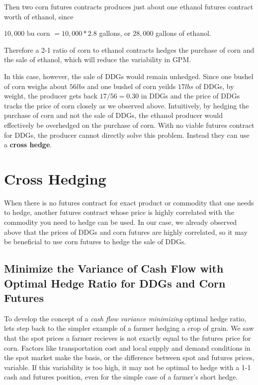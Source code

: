 \documentclass[
  letterpaper,
  DIV=11,
  numbers=noendperiod]{scrreprt}
\begin{document}
Then two corn futures contracts produces just about one ethanol futures
contract worth of ethanol, since

\(10,000\) bu corn \(= 10,000*2.8\) gallons, or \(28,000\) gallons of
ethanol.

Therefore a 2-1 ratio of corn to ethanol contracts hedges the purchase
of corn and the sale of ethanol, which will reduce the variability in
GPM.

In this case, however, the sale of DDGs would remain unhedged. Since one
bushel of corn weighs about \(56lbs\) and one bushel of corn yeilds
\(17lbs\) of DDGs, by weight, the producer gets back \(17/56 = 0.30\) in
DDGs and the price of DDGs tracks the price of corn closely as we
observed above. Intuitively, by hedging the purchase of corn and not the
sale of DDGs, the ethanol producer would effectively be overhedged on
the purchase of corn. With no viable futures contract for DDGs, the
producer cannot directly solve this problem. Instead they can use a
\textbf{cross hedge}.

\hypertarget{cross-hedging}{%
\section{Cross Hedging}\label{cross-hedging}}

When there is no futures contract for exact product or commodity that
one needs to hedge, another futures contract whose price is highly
correlated with the commodity you need to hedge can be used. In our
case, we already observed above that the prices of DDGs and corn futures
are highly correlated, so it may be beneficial to use corn futures to
hedge the sale of DDGs.

\hypertarget{minimize-the-variance-of-cash-flow-with-optimal-hedge-ratio-for-ddgs-and-corn-futures}{%
\subsection{Minimize the Variance of Cash Flow with Optimal Hedge Ratio
for DDGs and Corn
Futures}\label{minimize-the-variance-of-cash-flow-with-optimal-hedge-ratio-for-ddgs-and-corn-futures}}

To develop the concept of a \emph{cash flow variance minimizing} optimal
hedge ratio, lets step back to the simpler example of a farmer hedging a
crop of grain. We saw that the spot prices a farmer recieves is not
exactly equal to the futures price for corn. Factors like transportation
cost and local supply and demand conditions in the spot market make the
basis, or the difference between spot and futures prices, variable. If
this variability is too high, it may not be optimal to hedge with a 1-1
cash and futures position, even for the simple case of a farmer's short
hedge.
\end{document}
